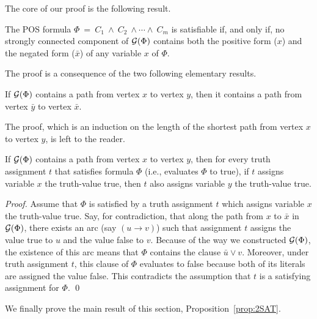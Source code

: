 \medskip

The core of our proof is the following result.

\begin{prop}
\label{prop:2SAT}
The POS formula $\Phi \ = \ C_1 \ \wedge \ C_2 \ \wedge \cdots \wedge \ C_m$ is satisfiable if, and only if, no strongly connected component of $\mbox{$\cal G$}(\Phi)$ contains both the positive form ($x$) and the negated form ($\bar{x}$) of any variable $x$ of $\Phi$.
\end{prop}

The proof is a consequence of the two following elementary results.

\begin{lemma}
\label{lem:2SATlemma1}
If $\mbox{$\cal G$}(\Phi)$ contains a path from vertex $x$ to vertex $y$, then it contains a path from vertex $\bar{y}$ to vertex $\bar{x}$.
\end{lemma}

The proof, which is an induction on the length of the shortest path from vertex $x$ to vertex $y$, is left to the reader. 

\begin{lemma}
\label{lem:2SATlemma2}
If $\mbox{$\cal G$}(\Phi)$ contains a path from vertex $x$ to vertex $y$, then for every truth assignment $t$ that satisfies formula $\Phi$ (i.e., evaluates $\Phi$ to {\sc true}), if $t$ assigns variable $x$ the
truth-value {\sc true}, then $t$ also assigns variable $y$ the truth-value {\sc true}.
\end{lemma}

\begin{proof}
Assume that $\Phi$ is satisfied by a truth assignment $t$ which assigns variable $x$ the truth-value {\sc true}.  Say, for contradiction, that along the path from $x$ to $\bar{x}$ in $\mbox{$\cal G$}(\Phi)$, there exists an arc (say $(u \rightarrow v)$) such that assignment $t$ assigns the value {\sc true} to $u$ and the value {\sc false} to $v$.  Because of the way we constructed $\mbox{$\cal G$}(\Phi)$, the existence of this arc means that $\Phi$ contains the clause $\bar{u} \vee v$.  Moreover, under truth assignment $t$, this clause of $\Phi$ evaluates to {\sc false} because both of its literals are assigned the value {\sc false}.  This contradicts the assumption that $t$ is a satisfying assignment for $\Phi$.  \qed
\end{proof}

We finally prove the main result of this section, Proposition~\ref{prop:2SAT}.

